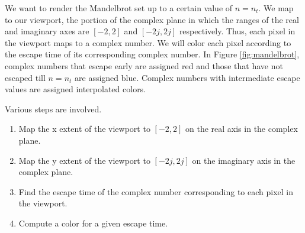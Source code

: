 \documentclass[addpoints]{exam}
\begin{document}
\begin{questions}
  We want to render the Mandelbrot set up to a certain value of $n=n_t$. We map to our viewport, the portion of the complex plane in which the ranges of the real and imaginary axes are $[-2,2]$ and $[-2j,2j]$ respectively. Thus, each pixel in the viewport maps to a complex number. We will color each pixel according to the escape time of its corresponding complex number. In Figure \ref{fig:mandelbrot}, complex numbers that escape early are assigned red and those that have not escaped till $n=n_t$ are assigned blue. Complex numbers with intermediate escape values are assigned interpolated colors.

  Various steps are involved.
  \begin{enumerate}
  \item Map the x extent of the viewport to $[-2,2]$ on the real axis in the complex plane.
  \item Map the y extent of the viewport to $[-2j,2j]$ on the imaginary axis in the complex plane.
  \item Find the escape time of the complex number corresponding to each pixel in the viewport.
  \item Compute a color for a given escape time.
  \end{enumerate}

\end{questions}
\end{document}
